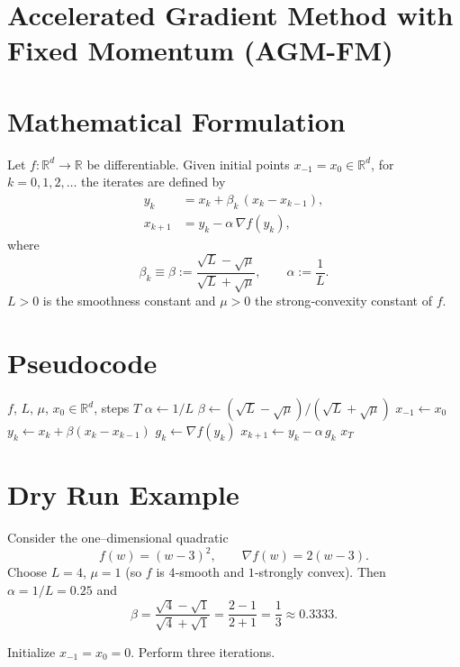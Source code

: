 \documentclass{article}
\newcommand{\grad}{\nabla}
\begin{document}
\section*{Accelerated Gradient Method with Fixed Momentum (AGM-FM)}

\section*{Mathematical Formulation}
Let $f:\mathbb{R}^d\to\mathbb{R}$ be differentiable.  
Given initial points $x_{-1}=x_0\in\mathbb{R}^d$, for $k=0,1,2,\dots$ the iterates are defined by
\[
\begin{aligned}
y_k &= x_k + \beta_k\,(x_k-x_{k-1}), \tag{1}\\[4pt]
x_{k+1} &= y_k - \alpha\,\grad f(y_k), \tag{2}
\end{aligned}
\]
where
\[
\beta_k\equiv\beta:=\frac{\sqrt{L}-\sqrt{\mu}}{\sqrt{L}+\sqrt{\mu}},\qquad 
\alpha:=\frac{1}{L}. \tag{3}
\]
$L>0$ is the smoothness constant and $\mu>0$ the strong‑convexity constant of $f$.

\section*{Pseudocode}
\begin{algorithm}[H]
\caption{Accelerated Gradient Method with Fixed Momentum}
\begin{algorithmic}[1]
\Require $f$, $L$, $\mu$, $x_0\in\mathbb{R}^d$, steps $T$
\State $\alpha \gets 1/L$
\State $\beta \gets (\sqrt{L}-\sqrt{\mu})/(\sqrt{L}+\sqrt{\mu})$
\State $x_{-1}\gets x_0$
    \State $y_k \gets x_k + \beta (x_k-x_{k-1})$ 
    \State $g_k \gets \grad f(y_k)$
    \State $x_{k+1} \gets y_k - \alpha\, g_k$ 
\EndFor
\State \Return $x_T$
\end{algorithmic}
\end{algorithm}

\section*{Dry Run Example}
Consider the one–dimensional quadratic
\[
f(w)=(w-3)^2,\qquad \grad f(w)=2(w-3).
\]
Choose $L=4$, $\mu=1$ (so $f$ is $4$‑smooth and $1$‑strongly convex).  
Then $\alpha=1/L=0.25$ and
\[
\beta=\frac{\sqrt{4}-\sqrt{1}}{\sqrt{4}+\sqrt{1}}=
\frac{2-1}{2+1}= \frac13\approx0.3333.
\]

Initialize $x_{-1}=x_0=0$.  Perform three iterations.
\end{document}

